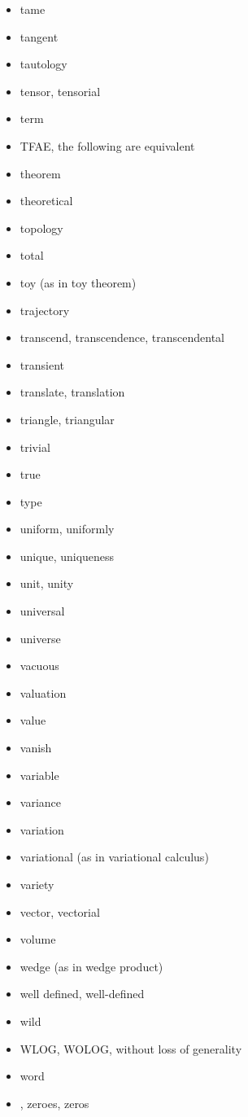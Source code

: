 \documentclass[12pt]{article}
\begin{document}
\begin{multicols}{3}{
\begin{itemize}
\item tame
\item tangent
\item tautology
\item tensor, tensorial
\item term
\item TFAE, the following are equivalent
\item theorem
\item theoretical
\item topology
\item total
\item toy (as in toy theorem)
\item trajectory 
\item transcend, transcendence, transcendental
\item transient
\item translate, translation
\item triangle, triangular
\item trivial
\item true
\item type
\item uniform, uniformly
\item unique, uniqueness
\item unit, unity
\item universal
\item universe
\item vacuous
\item valuation
\item value
\item vanish
\item variable
\item variance
\item variation
\item variational (as in variational calculus)
\item variety
\item vector, vectorial
\item volume
\item wedge (as in wedge product)
\item well defined, well-defined
\item wild
\item WLOG, WOLOG, without loss of generality
\item word
\item {}, zeroes, zeros
\end{itemize}
}
\end{multicols}
\end{document}
